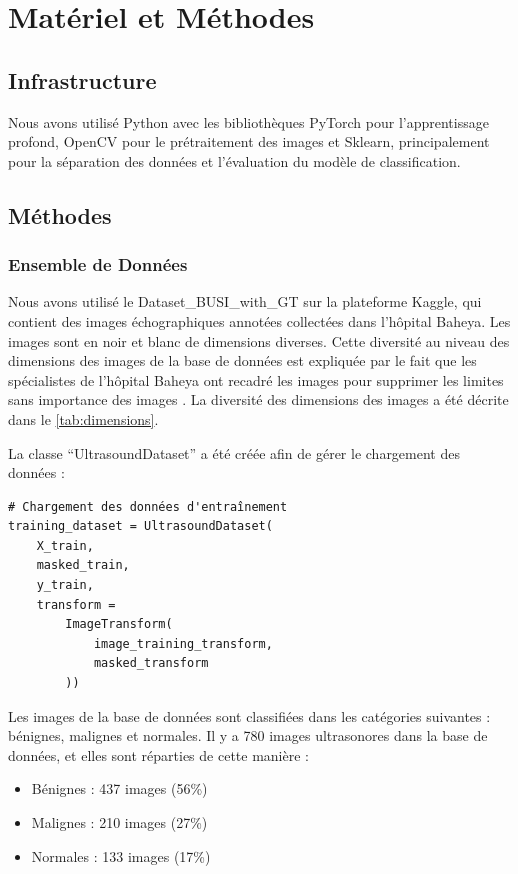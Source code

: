 \documentclass[a4paper,12pt]{article}
\begin{document}
\section{Matériel et Méthodes}

\subsection{Infrastructure}
Nous avons utilisé Python avec les bibliothèques PyTorch pour l'apprentissage profond, OpenCV pour le prétraitement des images et Sklearn, principalement pour la séparation des données et l'évaluation du modèle de classification.

\subsection{Méthodes}
\subsubsection{Ensemble de Données}
Nous avons utilisé le Dataset\_BUSI\_with\_GT \cite{al2020dataset} sur la plateforme Kaggle, qui contient des images échographiques annotées collectées dans l'hôpital Baheya. Les images sont en noir et blanc de dimensions diverses. Cette diversité au niveau des dimensions des images de la base de données est expliquée par le fait que les spécialistes de l'hôpital Baheya ont recadré les images pour supprimer les limites sans importance des images \cite{al2020dataset}. La diversité des dimensions des images a été décrite dans le \autoref{tab:dimensions}.

La classe \enquote{UltrasoundDataset} a été créée afin de gérer le chargement des données :
\begin{verbatim}
# Chargement des données d'entraînement
training_dataset = UltrasoundDataset(
    X_train,
    masked_train,
    y_train,
    transform =
        ImageTransform(
            image_training_transform,
            masked_transform
        ))
\end{verbatim}

Les images de la base de données sont classifiées dans les catégories suivantes : bénignes, malignes et normales. Il y a 780 images ultrasonores dans la base de données, et elles sont réparties de cette manière :
\begin{itemize}
    \item Bénignes : 437 images (56\%)
    \item Malignes : 210 images (27\%)
    \item Normales : 133 images (17\%)
\end{itemize}
\end{document}
